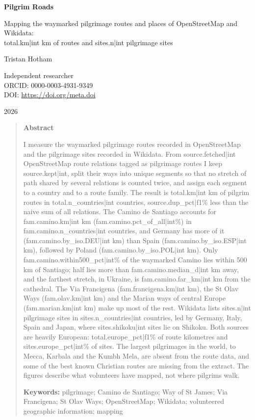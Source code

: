 \documentclass[11pt,a4paper]{article}
\begin{document}
\begin{center}
{\Large\bfseries Pilgrim Roads\par}
\vspace{0.4em}
{\large Mapping the waymarked pilgrimage routes and places of OpenStreetMap and Wikidata:\\{{total.km|int}} km of routes and {{sites.n|int}} pilgrimage sites\par}
\vspace{1.2em}
{\large Tristan Hotham\par}
\vspace{0.3em}
{\small Independent researcher\\
ORCID: 0000-0003-4931-9349\\
DOI: \href{https://doi.org/{{meta.doi}}}{https://doi.org/{{meta.doi}}}\par}
\vspace{0.8em}
2026
\end{center}

\begin{quote}
\small
\begin{center}\textbf{Abstract}\end{center}
I measure the waymarked pilgrimage routes recorded in OpenStreetMap and the pilgrimage sites recorded in Wikidata. From {{source.fetched|int}} OpenStreetMap route relations tagged as pilgrimage routes I keep {{source.kept|int}}, split their ways into unique segments so that no stretch of path shared by several relations is counted twice, and assign each segment to a country and to a route family. The result is {{total.km|int}} km of pilgrim routes in {{total.n_countries|int}} countries, {{source.dup_pct|f1}}\% less than the naive sum of all relations. The Camino de Santiago accounts for {{fam.camino.km|int}} km ({{fam.camino.pct_of_all|int}}\%) in {{fam.camino.n_countries|int}} countries, and Germany has more of it ({{fam.camino.by_iso.DEU|int}} km) than Spain ({{fam.camino.by_iso.ESP|int}} km), followed by Poland ({{fam.camino.by_iso.POL|int}} km). Only {{fam.camino.within500_pct|int}}\% of the waymarked Camino lies within 500 km of Santiago; half lies more than {{fam.camino.median_d|int}} km away, and the farthest stretch, in Ukraine, is {{fam.camino.far_km|int}} km from the cathedral. The Via Francigena ({{fam.francigena.km|int}} km), the St Olav Ways ({{fam.olav.km|int}} km) and the Marian ways of central Europe ({{fam.marian.km|int}} km) make up most of the rest. Wikidata lists {{sites.n|int}} pilgrimage sites in {{sites.n_countries|int}} countries, led by Germany, Italy, Spain and Japan, where {{sites.shikoku|int}} sites lie on Shikoku. Both sources are heavily European: {{total.europe_pct|f1}}\% of route kilometres and {{sites.europe_pct|int}}\% of sites. The largest pilgrimages in the world, to Mecca, Karbala and the Kumbh Mela, are absent from the route data, and some of the best known Christian routes are missing from the extract. The figures describe what volunteers have mapped, not where pilgrims walk.

\textbf{Keywords:} pilgrimage; Camino de Santiago; Way of St James; Via Francigena; St Olav Ways; OpenStreetMap; Wikidata; volunteered geographic information; mapping
\end{quote}
\end{document}
